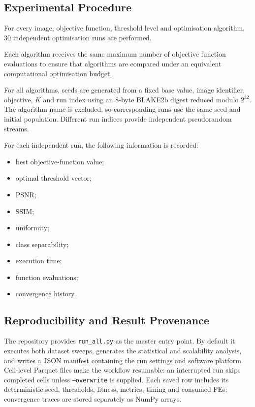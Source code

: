 \documentclass[review,authoryear]{elsarticle}
\begin{document}
\subsection{Experimental Procedure}

For every image, objective function, threshold level and optimisation
algorithm, 30 independent optimisation runs are performed.

Each algorithm receives the same maximum number of objective function
evaluations to ensure that algorithms are compared under an equivalent
computational optimisation budget.

For all algorithms, seeds are generated from a fixed
base value, image identifier, objective, $K$ and run index using an
8-byte BLAKE2b digest reduced modulo $2^{32}$. The algorithm name is
excluded, so corresponding runs use the same seed and initial population.
Different run indices provide independent pseudorandom streams.

For each independent run, the following information is recorded:

\begin{itemize}
    \item best objective-function value;
    \item optimal threshold vector;
    \item PSNR;
    \item SSIM;
    \item uniformity;
    \item class separability;
    \item execution time;
    \item function evaluations;
    \item convergence history.
\end{itemize}

\subsection{Reproducibility and Result Provenance}

The repository provides \texttt{run\_all.py} as the master entry point. By
default it executes both dataset sweeps, generates the statistical and
scalability analysis, and writes a JSON manifest containing the run settings
and software platform. Cell-level Parquet
files make the workflow resumable: an interrupted run skips completed cells
unless \texttt{--overwrite} is supplied. Each saved row includes its
deterministic seed, thresholds, fitness, metrics, timing and consumed FEs;
convergence traces are stored separately as NumPy arrays.
\end{document}
